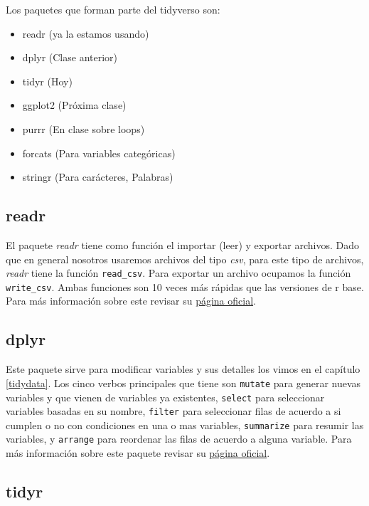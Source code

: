 \documentclass[]{book}
\providecommand{\tightlist}{%
  \setlength{\itemsep}{0pt}\setlength{\parskip}{0pt}}
\begin{document}
Los paquetes que forman parte del tidyverso son:

\begin{itemize}
\tightlist
\item
  readr (ya la estamos usando)
\item
  dplyr (Clase anterior)
\item
  tidyr (Hoy)
\item
  ggplot2 (Próxima clase)
\item
  purrr (En clase sobre loops)
\item
  forcats (Para variables categóricas)
\item
  stringr (Para carácteres, Palabras)
\end{itemize}

\hypertarget{readr}{%
\subsection{readr}\label{readr}}

El paquete \emph{readr} \citep{Wickhamreadr} tiene como función el
importar (leer) y exportar archivos. Dado que en general nosotros
usaremos archivos del tipo \emph{csv}, para este tipo de archivos,
\emph{readr} tiene la función \texttt{read\_csv}. Para exportar un
archivo ocupamos la función \texttt{write\_csv}. Ambas funciones son 10
veces más rápidas que las versiones de r base. Para más información
sobre este revisar su \href{https://readr.tidyverse.org/}{página
oficial}.

\hypertarget{dplyr-1}{%
\subsection{dplyr}\label{dplyr-1}}

Este paquete sirve para modificar variables y sus detalles los vimos en
el capítulo \ref{tidydata}. Los cinco verbos principales que tiene son
\texttt{mutate} para generar nuevas variables y que vienen de variables
ya existentes, \texttt{select} para seleccionar variables basadas en su
nombre, \texttt{filter} para seleccionar filas de acuerdo a si cumplen o
no con condiciones en una o mas variables, \texttt{summarize} para
resumir las variables, y \texttt{arrange} para reordenar las filas de
acuerdo a alguna variable. Para más información sobre este paquete
revisar su \href{https://dplyr.tidyverse.org/}{página oficial}.

\hypertarget{tidyr}{%
\subsection{tidyr}\label{tidyr}}
\end{document}

